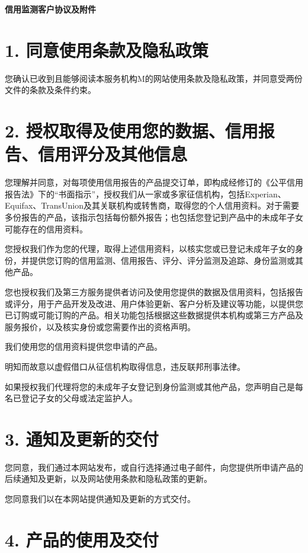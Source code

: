 \documentclass[UTF8,fontset=none,11pt,a4paper]{ctexart}
\begin{document}
{\noindent\fontsize{20}{25}\selectfont\bfseries 信用监测客户协议及附件\par}
\vspace{10pt}
\section*{1. 同意使用条款及隐私政策}
您确认已收到且能够阅读本服务机构M的网站使用条款及隐私政策，并同意受两份文件的条款及条件约束。


\section*{2. 授权取得及使用您的数据、信用报告、信用评分及其他信息}
您理解并同意，对每项使用信用报告的产品提交订单，即构成经修订的《公平信用报告法》下的“书面指示”，授权我们从一家或多家征信机构，包括Experian、Equifax、TransUnion及其关联机构或转售商，取得您的个人信用资料。对于需要多份报告的产品，该指示包括每份额外报告；也包括您登记到产品中的未成年子女可能存在的信用资料。


您授权我们作为您的代理，取得上述信用资料，以核实您或已登记未成年子女的身份，并提供您订购的信用监测、信用报告、评分、评分监测及追踪、身份监测或其他产品。


您也授权我们及第三方服务提供者访问及使用您提供的数据及信用资料，包括报告或评分，用于产品开发及改进、用户体验更新、客户分析及建议等功能，以提供您已订购或可能订购的产品。相关功能包括根据这些数据提供本机构或第三方产品及服务报价，以及核实身份或您需要作出的资格声明。


我们使用您的信用资料提供您申请的产品。


明知而故意以虚假借口从征信机构取得信息，违反联邦刑事法律。


如果授权我们代理将您的未成年子女登记到身份监测或其他产品，您声明自己是每名已登记子女的父母或法定监护人。


\section*{3. 通知及更新的交付}
您同意，我们通过本网站发布，或自行选择通过电子邮件，向您提供所申请产品的后续通知及更新，以及网站使用条款和隐私政策的更新。


您同意我们以在本网站提供通知及更新的方式交付。


\section*{4. 产品的使用及交付}
\end{document}
